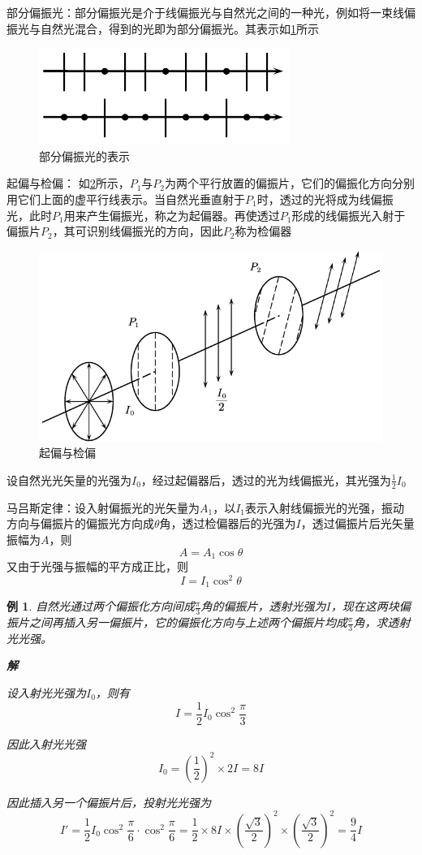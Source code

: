 \documentclass[12pt, a4paper, twoside]{ctexbook}
\newtheorem{example}[theorem]{例}
\begin{document}
{\sonti 部分偏振光}：部分偏振光是介于线偏振光与自然光之间的一种光，例如将一束线偏振光与自然光混合，得到的光即为部分偏振光。其表示如\textcolor{blue}{\cref{fig:部分偏振光}}所示
\begin{figure}[H]
    \centerline{\includegraphics[scale=1.2]{部分偏振光}}
    \caption{部分偏振光的表示}
    \label{fig:部分偏振光}
\end{figure}
{\sonti 起偏与检偏}：
如\textcolor{blue}{\cref{fig:起偏与检偏}}所示，$P_1$与$P_2$为两个平行放置的偏振片，它们的偏振化方向分别用它们上面的虚平行线表示。当自然光垂直射于$P_1$时，透过的光将成为线偏振光，此时$P_1$用来产生偏振光，称之为起偏器。再使透过$P_1$形成的线偏振光入射于偏振片$P_2$，其可识别线偏振光的方向，因此$P_2$称为检偏器
\begin{figure}[H]
    \centerline{\includegraphics[scale=1.0]{起偏与检偏}}
    \caption{起偏与检偏}
    \label{fig:起偏与检偏}
\end{figure}

设自然光光矢量的光强为$I_0$，经过起偏器后，透过的光为线偏振光，其光强为$\frac{1}{2}I_0$

{\sonti 马吕斯定律}：设入射偏振光的光矢量为$A_1$，以$I_1$表示入射线偏振光的光强，振动方向与偏振片的偏振光方向成$\theta$角，透过检偏器后的光强为$I$，透过偏振片后光矢量振幅为$A$，则
$$
A=A_1\cos\theta
$$
又由于光强与振幅的平方成正比，则
$$
I=I_1\cos^2\theta
$$
\begin{example}
    自然光通过两个偏振化方向间成$\frac{\pi}{3}$角的偏振片，透射光强为$I$，现在这两块偏振片之间再插入另一偏振片，它的偏振化方向与上述两个偏振片均成$\frac{\pi}{3}$角，求透射光光强。

    \noindent\textbf{解}

    设入射光光强为$I_0$，则有
    $$
    I=\frac{1}{2}I_0\cos^2\frac{\pi}{3}
    $$

    因此入射光光强
    $$
    I_0=\left(\frac{1}{2}\right)^2\times2I=8I
    $$

    因此插入另一个偏振片后，投射光光强为
    $$
    I'=\frac{1}{2}I_0 \cos^2\frac{\pi}{6}\cdot\cos^2\frac{\pi}{6}=\frac{1}{2}\times8I\times\left(\frac{\sqrt{3}}{2}\right)^2\times\left(\frac{\sqrt{3}}{2}\right)^2=\frac{9}{4}I
    $$
\end{example}
\end{document}
